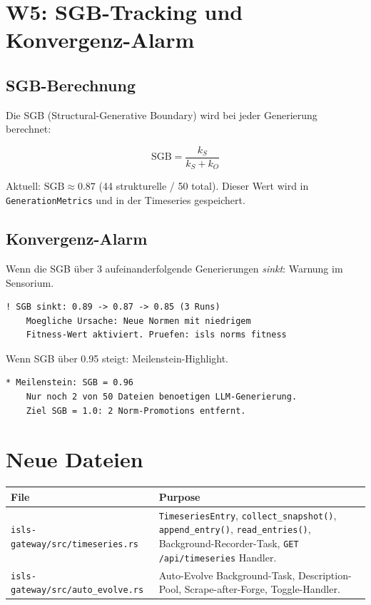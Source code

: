\documentclass[11pt,a4paper]{article}
\begin{document}
\section{W5: SGB-Tracking und Konvergenz-Alarm}
\label{sec:w5}

\subsection{SGB-Berechnung}

Die SGB (Structural-Generative Boundary) wird bei jeder 
Generierung berechnet:

\begin{equation}
\text{SGB} = \frac{k_S}{k_S + k_O}
\end{equation}

Aktuell: $\text{SGB} \approx 0.87$ (44 strukturelle / 50 
total). Dieser Wert wird in \texttt{GenerationMetrics} und 
in der Timeseries gespeichert.

\subsection{Konvergenz-Alarm}

Wenn die SGB \"uber 3 aufeinanderfolgende Generierungen 
\emph{sinkt}: Warnung im Sensorium.

\begin{lstlisting}[style=bash]
  ! SGB sinkt: 0.89 -> 0.87 -> 0.85 (3 Runs)
    Moegliche Ursache: Neue Normen mit niedrigem 
    Fitness-Wert aktiviert. Pruefen: isls norms fitness
\end{lstlisting}

Wenn SGB \"uber 0.95 steigt: Meilenstein-Highlight.

\begin{lstlisting}[style=bash]
  * Meilenstein: SGB = 0.96
    Nur noch 2 von 50 Dateien benoetigen LLM-Generierung.
    Ziel SGB = 1.0: 2 Norm-Promotions entfernt.
\end{lstlisting}


\section{Neue Dateien}

\begin{longtable}{lp{10cm}}
\toprule
\textbf{File} & \textbf{Purpose} \\
\midrule
\texttt{isls-gateway/src/timeseries.rs}
  & \texttt{TimeseriesEntry}, \texttt{collect\_snapshot()}, 
    \texttt{append\_entry()}, \texttt{read\_entries()}, 
    Background-Recorder-Task, \texttt{GET /api/timeseries} 
    Handler. \\
\texttt{isls-gateway/src/auto\_evolve.rs}
  & Auto-Evolve Background-Task, Description-Pool, 
    Scrape-after-Forge, Toggle-Handler. \\
\bottomrule
\end{longtable}
\end{document}

